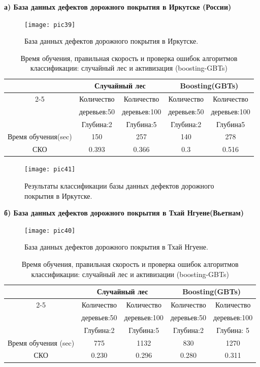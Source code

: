 \documentclass[a4paper,14pt]{extreport}
\begin{document}
\textbf{а) База данных дефектов дорожного покрытия в Иркутске (России)}

\begin{figure}[ht!]
\centering
\texttt{[image: pic39]}
\caption{База данных дефектов дорожного покрытия в Иркутске.}
	\label{pic39}
		\end{figure}
	
	\begin{table}[h]
			\centering
			\begin{tabular}{|c|c|c|c|c|}
\hline
 &\multicolumn{2}{|c|}{Случайный лес}&\multicolumn{2}{|c|}{ Boosting(GBTs)}\\
\cline{2-5}
 \multirow{3}{*}&Количество &Количество &Количество &Количество \\
 &деревьев:50 &деревьев:100 &деревьев:50 &деревьев:100\\
 &Глубина:2 &Глубина:5  &Глубина:2 &Глубина5 \\ \hline 
Время обучения(sec)&150&257&140&278\\
СКО             &0.393&0.366&0.3&0.516 \\ \hline 
\end{tabular}
\caption{Время обучения, правильная скорость и проверка ошибок алгоритмов классификации: случайный лес и активизация (boosting-GBTs)} \label{tab4}
		\end{table}
	
\begin{figure}[ht!]
\centering
\texttt{[image: pic41]}
\caption{Результаты классификации базы данных дефектов дорожного покрытия в Иркутске.}
	\label{pic41}
		\end{figure}
		
\textbf{б) База данных дефектов дорожного покрытия в Тхай Нгуене(Вьетнам)}

\begin{figure}[ht!]
\centering
\texttt{[image: pic40]}
\caption{База данных дефектов дорожного покрытия в Тхай Нгуене.}
	\label{pic40}
		\end{figure}
	
	\begin{table}[h]
			\centering
			\begin{tabular}{|c|c|c|c|c|}
\hline
 &\multicolumn{2}{|c|}{Случайный лес}&\multicolumn{2}{|c|}{ Boosting(GBTs)}\\
\cline{2-5}
 \multirow{3}{*} &Количество &Количество &Количество &Количество \\
                 &деревьев:50 &деревьев:100 &деревьев:50 &деревьев:100\\
                 &Глубина:2 &Глубина:5  &Глубина:2 &Глубина: 5 \\ 
\hline 
Время обучения (sec)&775&1132&830&1270\\
СКО             &0.230&0.296&0.280&0.311 \\ \hline 
\end{tabular}
\caption{Время обучения, правильная скорость и проверка ошибок алгоритмов классификации: случайный лес и активизации (boosting-GBTs)} \label{tab10}
		\end{table}
		
\end{document}
